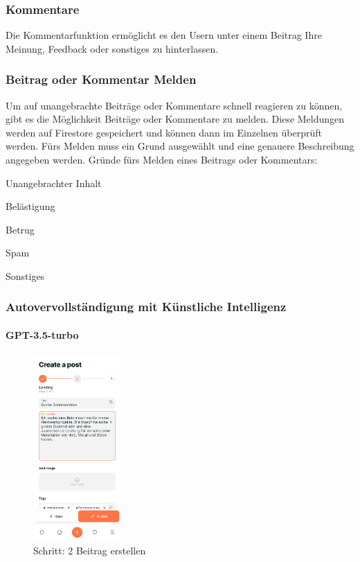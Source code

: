\subsubsection{Kommentare}
Die Kommentarfunktion ermöglicht es den Usern unter einem Beitrag Ihre Meinung, Feedback oder sonstiges zu hinterlassen.

\subsubsection{Beitrag oder Kommentar Melden}
Um auf unangebrachte Beiträge oder Kommentare schnell reagieren zu können, gibt es die Möglichkeit Beiträge oder Kommentare zu melden. Diese Meldungen werden auf Firestore gespeichert und können dann im Einzelnen überprüft werden. Fürs Melden muss ein Grund ausgewählt und eine genauere Beschreibung angegeben werden.
Gründe fürs Melden eines Beitrags oder Kommentars:

\begin{compactitem}
  \item Unangebrachter Inhalt
  \item Belästigung
  \item Betrug
  \item Spam
  \item Sonstiges


\end{compactitem}

\subsubsection{Autovervollständigung
  mit Künstliche Intelligenz}
\paragraph{GPT-3.5-turbo}


\begin{figure}[H]
  \centering
  \includegraphics[width=0.3\textwidth]{pics/create-post.png}
  \caption{Schritt: 2 Beitrag erstellen}
  \label{fig:createpost}
\end{figure}


